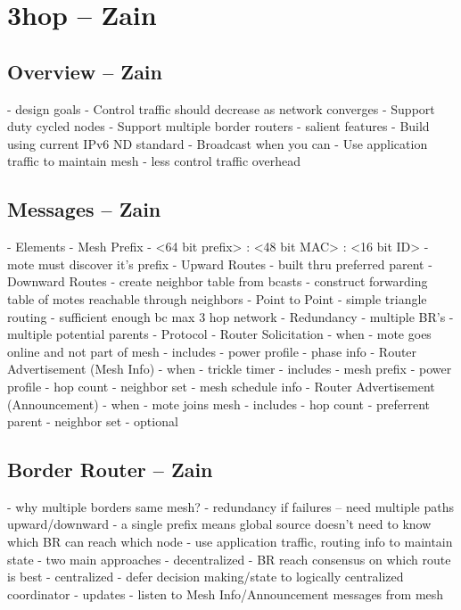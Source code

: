 \section{3hop -- Zain}

\subsection{Overview -- Zain}
- design goals
    - Control traffic should decrease as network converges
    - Support duty cycled nodes
    - Support multiple border routers
- salient features
    - Build using current IPv6 ND standard
    - Broadcast when you can
    - Use application traffic to maintain mesh
    - less control traffic overhead
\fi

\subsection{Messages -- Zain}
- Elements
    - Mesh Prefix
        - <64 bit prefix> : <48 bit MAC> : <16 bit ID>
        - mote must discover it's prefix
    - Upward Routes
        - built thru preferred parent
    - Downward Routes
        - create neighbor table from bcasts
        - construct forwarding table of motes reachable through neighbors
    - Point to Point
        - simple triangle routing
        - sufficient enough bc max 3 hop network
    - Redundancy
        - multiple BR's
        - multiple potential parents
- Protocol
    - Router Solicitation
        - when
            - mote goes online and not part of mesh
        - includes
            - power profile
            - phase info
    - Router Advertisement (Mesh Info)
        - when
            - trickle timer
        - includes
            - mesh prefix
            - power profile
            - hop count
            - neighbor set
            - mesh schedule info
    - Router Advertisement (Announcement)
        - when
            - mote joins mesh
        - includes
            - hop count
            - preferrent parent
            - neighbor set
        - optional
\fi

\subsection{Border Router -- Zain}
\if
- why multiple borders same mesh?
    - redundancy if failures -- need multiple paths upward/downward
    - a single prefix means global source doesn't need to know which BR can reach which node
    - use application traffic, routing info to maintain state
- two main approaches
    - decentralized
        - BR reach consensus on which route is best
    - centralized
        - defer decision making/state to logically centralized coordinator
- updates
    - listen to Mesh Info/Announcement messages from mesh
\fi



